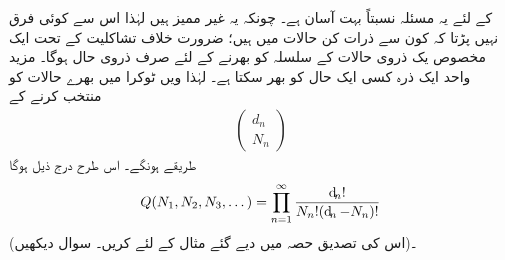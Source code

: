 کے لئے یہ مسئلہ نسبتاً بہت آسان ہے۔ چونکہ یہ غیر ممیز ہیں لہٰذا اس سے کوئی فرق نہیں پڑتا کہ  کون سے  ذرات   کن حالات میں ہیں؛ ضرورت خلاف تشاکلیت کے تحت ایک مخصوص یک ذروی حالات کے سلسلہ کو بھرنے کے لئے صرف    ذروی  حال ہوگا۔  مزید واحد ایک ذرہ  کسی ایک حال کو بھر سکتا ہے۔ لہٰذا  ویں ٹوکرا میں  بهرے  حالات کو منتخب کرنے کے 
\begin{align*}
\begin{pmatrix}
d_n \\
N_n
\end{pmatrix}
\end{align*}
طریقے  ہونگے۔  اس طرح درج ذیل ہوگا 
\begin{align}\label{مساوات_متماثل_فرمیان_اجتماعات}
Q (N_1 , N_2 , N_3 , \dotsc ) = \prod_{n = 1}^{\infty} \frac{\dif_n !}{N_n ! (\dif_n - N_n) !}
\end{align}
(اس کی تصدیق   حصہ    میں دیے گئے مثال کے لئے   کریں۔   سوال    دیکھیں)۔

